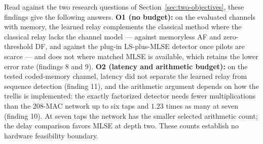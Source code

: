 Read against the two research questions of Section~\ref{sec:two-objectives}, these findings give the following answers. \textbf{O1 (no budget):} on the evaluated channels with memory, the learned relay complements the classical method where the classical relay lacks the channel model --- against memoryless AF and zero-threshold DF, and against the plug-in LS-plus-MLSE detector once pilots are scarce --- and does not where matched MLSE is available, which retains the lower error rate (findings 8 and 9). \textbf{O2 (latency and arithmetic budget):} on the tested coded-memory channel, latency did not separate the learned relay from sequence detection (finding 11), and the arithmetic argument depends on how the trellis is implemented: the exactly factorized detector needs fewer multiplications than the 208-MAC network up to six taps and $1.23$ times as many at seven (finding 10). At seven taps the network has the smaller selected arithmetic count; the delay comparison favors MLSE at depth two. These counts establish no hardware feasibility boundary.

